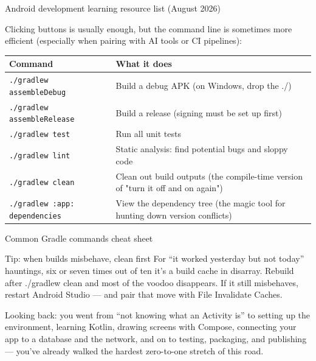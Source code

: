 \begin{center}\small\color{gray}Android development learning resource list (August 2026)\end{center}


Clicking buttons is usually enough, but the command line is sometimes more efficient (especially when pairing with AI tools or CI pipelines):

\begin{center}
\begin{tabularx}{\linewidth}{|X|X|}
\hline
\textbf{Command} & \textbf{What it does} \tabularnewline
\hline
\texttt{.\allowbreak /\allowbreak gradlew assembleDebug} & Build a debug APK (on Windows, drop the ./) \tabularnewline
\texttt{.\allowbreak /\allowbreak gradlew assembleRelease} & Build a release (signing must be set up first) \tabularnewline
\texttt{.\allowbreak /\allowbreak gradlew test} & Run all unit tests \tabularnewline
\texttt{.\allowbreak /\allowbreak gradlew lint} & Static analysis: find potential bugs and sloppy code \tabularnewline
\texttt{.\allowbreak /\allowbreak gradlew clean} & Clean out build outputs (the compile-time version of "turn it off and on again") \tabularnewline
\texttt{.\allowbreak /\allowbreak gradlew :app: dependencies} & View the dependency tree (the magic tool for hunting down version conflicts) \tabularnewline
\hline
\end{tabularx}
\end{center}

\begin{center}\small\color{gray}Common Gradle commands cheat sheet\end{center}

\begin{tcbinfo}{Tip: when builds misbehave, clean first}
For “it worked yesterday but not today” hauntings, six or seven times out of ten it's a build cache in disarray. Rebuild after ./gradlew clean and most of the voodoo disappears. If it still misbehaves, restart Android Studio — and pair that move with File Invalidate Caches.

\end{tcbinfo}



Looking back: you went from “not knowing what an Activity is” to setting up the environment, learning Kotlin, drawing screens with Compose, connecting your app to a database and the network, and on to testing, packaging, and publishing — you've already walked the hardest zero-to-one stretch of this road.

